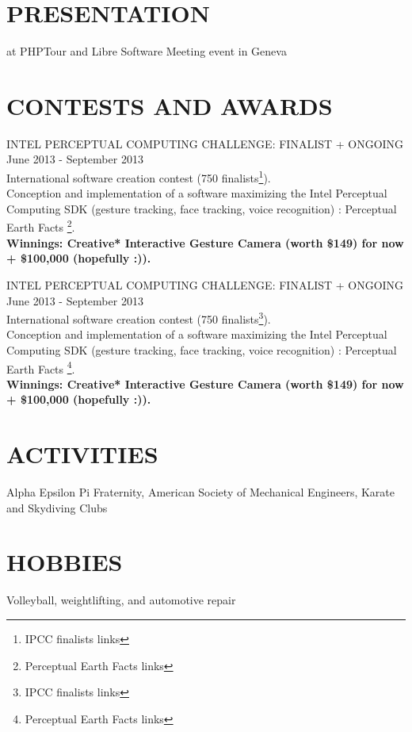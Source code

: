 \documentclass[11pt]{res} %
\begin{document}
\begin{resume}
\section{PRESENTATION} 
at PHPTour and Libre Software Meeting event in Geneva

\section{CONTESTS AND AWARDS} 
 
INTEL PERCEPTUAL COMPUTING CHALLENGE: FINALIST + ONGOING \\
June 2013 - September 2013 \\
International software creation contest  (750 finalists\footnote{IPCC finalists links}). \\
Conception and implementation of a software maximizing the Intel Perceptual Computing SDK (gesture tracking, face tracking, voice recognition) : Perceptual Earth Facts \footnote{Perceptual Earth Facts links}. \\
{\bf Winnings: Creative* Interactive Gesture Camera (worth \$149) for now + \$100,000 (hopefully :)).}

INTEL PERCEPTUAL COMPUTING CHALLENGE: FINALIST + ONGOING \\
June 2013 - September 2013 \\
International software creation contest  (750 finalists\footnote{IPCC finalists links}). \\
Conception and implementation of a software maximizing the Intel Perceptual Computing SDK (gesture tracking, face tracking, voice recognition) : Perceptual Earth Facts \footnote{Perceptual Earth Facts links}. \\
{\bf Winnings: Creative* Interactive Gesture Camera (worth \$149) for now + \$100,000 (hopefully :)).}
 
\section{ACTIVITIES} 
 
Alpha Epsilon  Pi  Fraternity,  American  Society  of  Mechanical 
Engineers, Karate and Skydiving Clubs 
 
\section{HOBBIES} 
 
Volleyball, weightlifting, and automotive repair 
 

\end{resume}
\end{document}
